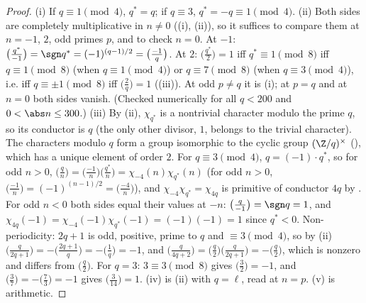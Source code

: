 \begin{proof}
(i) If $q\equiv1\pmod4$, $q^*=q$; if $q\equiv3$, $q^*=-q\equiv1\pmod4$. (ii) Both sides are completely multiplicative in $n\ne0$
((i), (ii)), so it suffices to compare them at $n=-1$, $2$, odd primes $p$, and to check $n=0$. At $-1$:
$\bigl(\frac{q^*}{-1}\bigr)=\sgn q^*=(-1)^{(q-1)/2}=\bigl(\frac{-1}q\bigr)$. At $2$: $\bigl(\frac{q^*}2\bigr)=1$ iff $q^*\equiv1\pmod8$ iff $q\equiv1\pmod8$ (when $q\equiv1\pmod4$) or $q\equiv7\pmod8$ (when
$q\equiv3\pmod4$), i.e. iff $q\equiv\pm1\pmod8$ iff $\bigl(\frac2q\bigr)=1$ ((iii)). At odd $p\ne q$ it is (i); at $p=q$ and at $n=0$
both sides vanish. (Checked numerically for all $q<200$ and $0<\abs n\le300$.)
(iii) By (ii), $\chi_{q^*}$ is a nontrivial character modulo the prime $q$, so its conductor is $q$ (the only other divisor, $1$, belongs to the
trivial character). The characters modulo $q$ form a group isomorphic to the cyclic group $(\Z/q)^\times$ (), which has
a unique element of order $2$. For $q\equiv3\pmod4$, $q=(-1)\cdot q^*$, so for odd $n>0$, $\bigl(\frac qn\bigr)=\bigl(\frac{-1}n\bigr)\bigl(\frac{q^*}n\bigr)=\chi_{-4}(n)\chi_{q^*}(n)$ (for odd $n>0$,
$\bigl(\frac{-1}n\bigr)=(-1)^{(n-1)/2}=\bigl(\frac{-4}n\bigr)$), and $\chi_{-4}\chi_{q^*}=\chi_{4q}$ is primitive of conductor $4q$ by . For odd $n<0$ both sides equal their
values at $-n$: $\bigl(\frac q{-1}\bigr)=\sgn q=1$, and $\chi_{4q}(-1)=\chi_{-4}(-1)\chi_{q^*}(-1)=(-1)(-1)=1$ since $q^*<0$. Non-periodicity: $2q+1$ is odd, positive,
prime to $q$ and $\equiv3\pmod4$, so by (ii) $\bigl(\frac q{2q+1}\bigr)=-\bigl(\frac{2q+1}q\bigr)=-\bigl(\frac1q\bigr)=-1$, and
$\bigl(\frac q{4q+2}\bigr)=\bigl(\frac q2\bigr)\bigl(\frac q{2q+1}\bigr)=-\bigl(\frac q2\bigr)$, which is nonzero and differs from $\bigl(\frac q2\bigr)$. For $q=3$: $3\equiv3\pmod8$ gives
$\bigl(\frac32\bigr)=-1$, and $\bigl(\frac37\bigr)=-\bigl(\frac73\bigr)=-1$ gives $\bigl(\frac3{14}\bigr)=1$.
(iv) is (ii) with $q=\ell$, read at $n=p$. (v) is arithmetic.
\end{proof}

